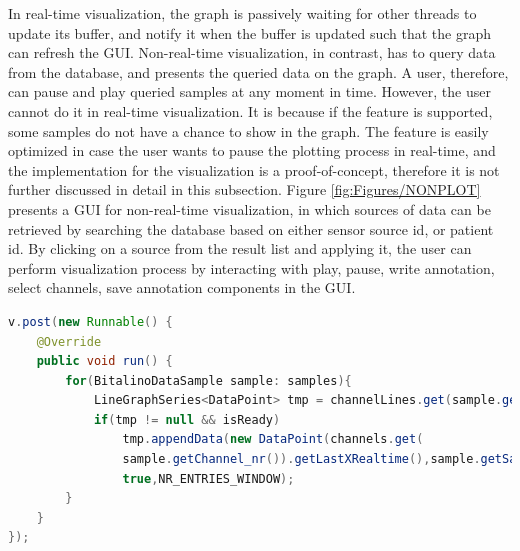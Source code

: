 In real-time visualization, the graph is passively waiting for other threads to update its buffer, and notify it when the buffer is updated such that the graph can refresh the GUI. Non-real-time visualization, in contrast, has to query data from the database, and presents the queried data on the graph. A user, therefore, can pause and play queried samples at any moment in time. However, the user cannot do it in real-time visualization. It is because if the feature is supported, some samples do not have a chance to show in the graph. The feature is easily optimized in case the user wants to pause the plotting process in real-time, and the implementation for the visualization is a proof-of-concept, therefore it is not further discussed in detail in this subsection. Figure \ref{fig:Figures/NONPLOT} presents a GUI for non-real-time visualization, in which sources of data can be retrieved by searching the database based on either sensor source id, or patient id. By clicking on a source from the result list and applying it, the user can perform visualization process by interacting with play, pause, write annotation, select channels, save annotation components in the GUI.\\
\begin{minipage}{\linewidth}
\begin{lstlisting}[caption={Update samples to GUI}, label = {listing:PLOTGUI}, captionpos=b, language=Java]
v.post(new Runnable() {
    @Override
    public void run() {
        for(BitalinoDataSample sample: samples){
            LineGraphSeries<DataPoint> tmp = channelLines.get(sample.getChannel_nr());
            if(tmp != null && isReady)
                tmp.appendData(new DataPoint(channels.get(
                sample.getChannel_nr()).getLastXRealtime(),sample.getSample_data()),
                true,NR_ENTRIES_WINDOW);
        }
    }
});
\end{lstlisting}
\end{minipage}
